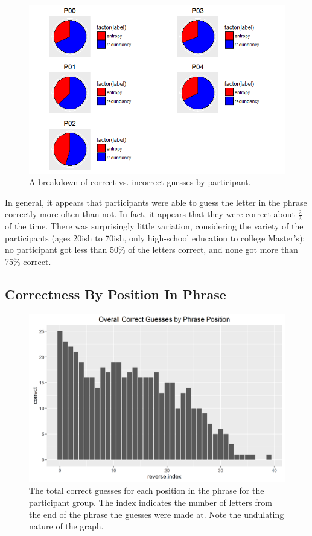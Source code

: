 \documentclass{article}
\begin{document}
\begin{figure}[h!]
\centering
\includegraphics[width=.65\linewidth]{participant-redundancy-entropy}
\caption{A breakdown of correct vs. incorrect guesses by participant.}
\label{fig:participant-redundancy-entropy}
\end{figure}

In general, it appears that participants were able to guess the letter in the phrase correctly more often than not. In fact, it appears that they were correct about $\frac{2}{3}$ of the time. There was surprisingly little variation, considering the variety of the participants (ages 20ish to 70ish, only high-school education to college Master's); no participant got less than 50\% of the letters correct, and none got more than 75\% correct.

%
\subsection{Correctness By Position In Phrase}
\begin{figure}[h!]
\centering
\includegraphics[width=.65\linewidth]{overall-correct-by-phrase-position}
\caption{The total correct guesses for each position in the phrase for the participant group. The index indicates the number of letters from the end of the phrase the guesses were made at. Note the undulating nature of the graph.}
\label{fig:overall-correct-by-phrase-position}
\end{figure}
\end{document}

